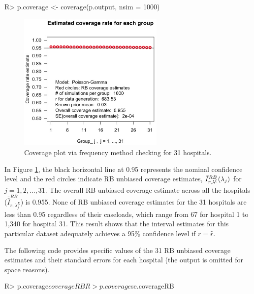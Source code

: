 \documentclass[article]{jss}
\begin{document}
\begin{CodeChunk}
\begin{CodeInput}
R> p.coverage <- coverage(p.output, nsim = 1000)
\end{CodeInput}
\end{CodeChunk}
\begin{figure}[h] 
\begin{center}
\includegraphics[width = 2.8in]{hospital2.png}
\caption{Coverage plot via frequency method checking for 31 hospitals.}
\label{fig:hospitalcoverage}
\end{center}
\end{figure}

In Figure \ref{fig:hospitalcoverage}, the black horizontal line at 0.95 represents the nominal confidence level  and the red circles indicate RB unbiased coverage estimates, $\bar{I}^{RB}_{r, \lambda^{\mathsf{E}}}(\lambda_j)$ for $j=1, 2, \ldots, 31$. The overall RB unbiased coverage estimate across all the hospitals ($\bar{\bar{I}}^{RB}_{r, \lambda^E_j}$) is 0.955. None of RB unbiased coverage estimates for the 31 hospitals are less than 0.95 regardless of their caseloads, which range from 67 for hospital 1 to 1,340 for hospital 31. This result shows that the interval estimates for this particular dataset adequately achieves a 95\% confidence level if $r=\hat{r}$.


The following code provides specific values of the 31 RB unbiased coverage estimates and their standard errors for each hospital (the output is omitted for space reasons).
\begin{CodeChunk}
\begin{CodeInput}
R> p.coverage$coverageRB
R> p.coverage$se.coverageRB
\end{CodeInput}
\end{CodeChunk}
\end{document}
